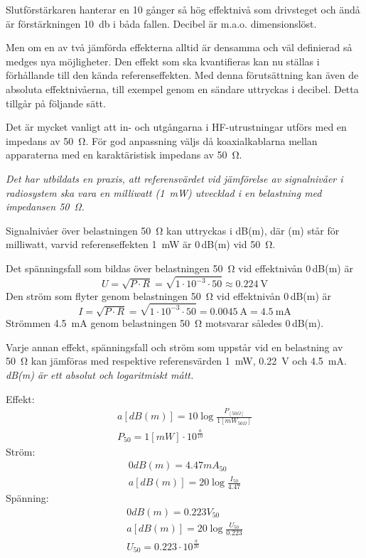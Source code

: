 Slutförstärkaren hanterar en 10 gånger så hög effektnivå som drivsteget och ändå
är förstärkningen \SI{10}{\decibel} i båda fallen.
Decibel är m.a.o. dimensionslöst.

Men om en av två jämförda effekterna alltid är densamma och väl
definierad så medges nya möjligheter. Den effekt som ska
kvantifieras kan nu ställas i förhållande till den kända
referenseffekten. Med denna förutsättning kan även de absoluta
effektnivåerna, till exempel genom en sändare uttryckas i decibel. Detta
tillgår på följande sätt.

Det är mycket vanligt att in- och utgångarna i HF-utrustningar utförs
med en impedans av \SI{50}{\ohm}.
För god anpassning väljs då koaxialkablarna mellan apparaterna med en
karaktäristisk impedans av \SI{50}{\ohm}.

\emph{Det har utbildats en praxis, att referensvärdet vid jämförelse
  av signalnivåer i radiosystem ska vara en milliwatt (\SI{1}{\milli\watt})
  utvecklad i en belastning med impedansen \SI{50}{\ohm}.}

Signalnivåer över belastningen \SI{50}{\ohm} kan uttryckas i dB(m), där (m)
står för milliwatt, varvid referenseffekten \SI{1}{\milli\watt} är 0\,dB(m) vid
\SI{50}{\ohm}.

Det spänningsfall som bildas över belastningen \SI{50}{\ohm} vid effektnivån
0\,dB(m) är
\[U = \sqrt{P\cdot R} = \sqrt{1\cdot 10^{-3} \cdot 50} \approx \SI{0.224}{\volt}\]
Den ström som flyter genom belastningen \SI{50}{\ohm} vid effektnivån 0\,dB(m)
är
\[
I = \sqrt{P \cdot R} = \sqrt{1\cdot 10^{-3}\cdot50} = \SI{0.0045}{\ampere} = \SI{4.5}{\milli\ampere}
\]
Strömmen \SI{4,5}{\milli\ampere} genom belastningen \SI{50}{\ohm} motsvarar
således 0\,dB(m).

Varje annan effekt, spänningsfall och ström som uppstår vid en belastning av
\SI{50}{\ohm} kan jämföras med respektive referensvärden \SI{1}{\milli\watt},
\SI{0,22}{\volt} och \SI{4,5}{\milli\ampere}.
\emph{dB(m) är ett absolut och logaritmiskt mått.}

\noindent
Effekt:
\begin{gather*}
  a [dB(m)] = 10 \log\frac{P_{[50\Omega]}}{1[mW_{50\Omega}]} \\
  P_{50} = 1 [mW] \cdot 10^{\frac{a}{10}}
\end{gather*}
Ström:
\begin{gather*}
  0 dB(m) = 4.47 mA_{50} \\
  a [dB(m)] = 20 \log\frac{I_{50}}{4.47}
\end{gather*}
Spänning:
\begin{gather*}
  0 dB(m) = 0.223 V_{50} \\
  a [dB(m)] = 20 \log\frac{U_{50}}{0.223} \\
  U_{50} = 0.223 \cdot 10^{\frac{a}{20}}
\end{gather*}

